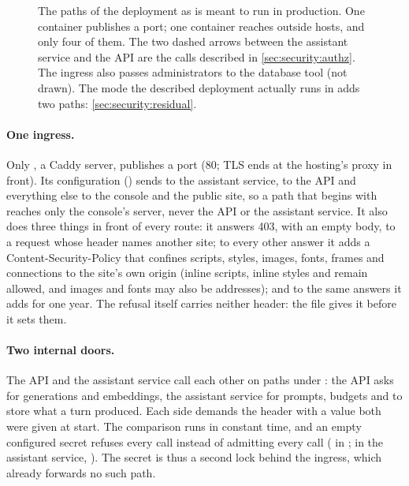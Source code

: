 \begin{figure}[H]
\caption{The paths of the deployment as  is meant to run in
production. One container publishes a port; one container reaches outside hosts, and only
four of them. The two dashed arrows between the assistant service and the API are the calls
described in \cref{sec:security:authz}. The ingress also passes administrators to the
database tool (not drawn). The mode the described deployment actually runs in adds two
paths: \cref{sec:security:residual}.}\label{fig:security:network}
\end{figure}

\paragraph{One ingress.} Only , a Caddy server, publishes a port
(80; TLS ends at the hosting's proxy in front). Its configuration ()
sends  to the assistant service,  to the API and
everything else to the console and the public site, so a path that begins with
 reaches only the console's server, never the API or the assistant service.
It also does three things in front of every
route: it answers 403, with an empty body, to a request whose  header names
another site; to every other answer it adds a
Content-Security-Policy that confines scripts, styles, images, fonts, frames and connections
to the site's own origin (inline scripts, inline styles and  remain allowed, and
images and fonts may also be  addresses); and to the same answers it adds
 for one year. The refusal itself carries neither header: the
file gives it before it sets them.

\paragraph{Two internal doors.} The API and the assistant service call each other on paths
under : the API asks for generations and embeddings, the assistant service
for prompts, budgets and to store what a turn produced. Each side demands the header
 with a value both were given at start. The comparison runs in
constant time, and an empty configured secret refuses every call instead of admitting every
call ( in ;
 in the assistant service, ). The secret
is thus a second lock behind the ingress, which already forwards no such path.

